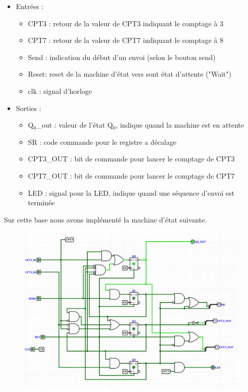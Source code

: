 \documentclass[a4paper]{article} %
\begin{document}
\begin{tcolorbox}[colframe=Monokaimagenta,colback=white, breakable, enhanced]
\begin{itemize}
	\item Entrées :
	\begin{itemize}
		\item CPT3 : retour de la valeur de CPT3 indiquant le comptage à 3
		\item CPT7 : retour de la valeur de CPT7 indiquant le comptage à 8
		\item Send : indication du début d'un envoi (selon le bouton send)
		\item Reset: reset de la machine d'état vers sont état d'attente ("Wait")
		\item clk  : signal d'horloge
	\end{itemize}
	\item Sorties :
	\begin{itemize}
		\item Q$_0$\_out : valeur de l'état Q$_0$, indique quand la machine est en attente
		\item SR		 : code commande pour le registre a décalage
		\item CPT3\_OUT  	 : bit de commande pour lancer le comptage de CPT3
		\item CPT7\_OUT	 : bit de commande pour lancer le comptage de CPT7
		\item LED        : signal pour la LED, indique quand une séquence d'envoi est terminée
	\end{itemize}
\end{itemize}

Sur cette base nous avons implémenté la machine d'état suivante.
\begin{figure}[H]
	\centering
	\includegraphics[width=\textwidth]{src/FSM}
	\label{fig:FSM}
\end{figure}


\end{tcolorbox}
\end{document}
